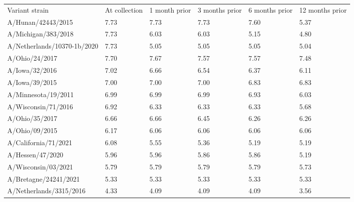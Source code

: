 \begin{tabular}{L{1.95in}|L{.6in}|L{.60in}|L{.6in}|C{.6in}|C{.6in}}\hline
 Variant  strain & At  collection & 1  month  prior & 3  months  prior & 6  months  prior & 12  months  prior \\
A/Hunan/42443/2015&7.73&7.73&7.73&7.60&5.37\\
A/Michigan/383/2018&7.73&6.03&6.03&5.15&4.80\\
A/Netherlands/10370-1b/2020&7.73&5.05&5.05&5.05&5.04\\
A/Ohio/24/2017&7.70&7.67&7.57&7.57&7.48\\
A/Iowa/32/2016&7.02&6.66&6.54&6.37&6.11\\
A/Iowa/39/2015&7.00&7.00&7.00&6.83&6.83\\
A/Minnesota/19/2011&6.99&6.99&6.99&6.93&6.03\\
A/Wisconsin/71/2016&6.92&6.33&6.33&6.33&5.68\\
A/Ohio/35/2017&6.66&6.66&6.45&6.26&6.26\\
A/Ohio/09/2015&6.17&6.06&6.06&6.06&6.06\\
A/California/71/2021&6.08&5.55&5.36&5.19&5.19\\
A/Hessen/47/2020&5.96&5.96&5.86&5.86&5.19\\
A/Wisconsin/03/2021&5.79&5.79&5.79&5.79&5.73\\
A/Bretagne/24241/2021&5.33&5.33&5.33&5.33&5.33\\
A/Netherlands/3315/2016&4.33&4.09&4.09&4.09&3.56\\
\hline\end{tabular}
